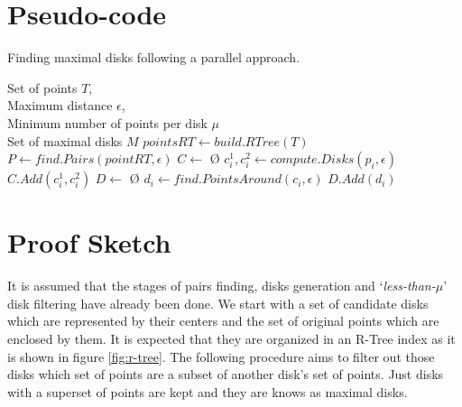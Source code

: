 \documentclass[12pt]{scrartcl}
\begin{document}
\renewcommand{\algorithmicrequire}{\textbf{Input:}}
\renewcommand{\algorithmicensure}{\textbf{Output:}}
\renewcommand{\algorithmicforall}{\textbf{for each}}

\section*{Pseudo-code}

\begin{algorithm}
  \caption{Finding maximal disks following a parallel approach.}
  \label{alg:maximals}
  \begin{algorithmic}
    \REQUIRE 
    Set of points $T$, \\
    Maximum distance $\epsilon$, \\ 
    Minimum number of points per disk $\mu$ \\

    \ENSURE 
    Set of maximal disks $M$ 
    \vspace{5mm}
    \STATE $pointsRT \leftarrow build.RTree(T)$ 
    \STATE $P \leftarrow find.Pairs(pointRT, \epsilon)$ 
    \STATE $C \leftarrow$ \O{}
      \STATE $c_i^1, c_i^2 \leftarrow compute.Disks(p_i,\epsilon)$ 
      \STATE $C.Add(c_i^1, c_i^2)$
    \ENDFOR
    \STATE $D \leftarrow$ \O{}
      \STATE $d_i \leftarrow find.PointsAround(c_i, \epsilon)$ 
	\STATE $D.Add(d_i)$
      \ENDIF
    \ENDFOR
  \end{algorithmic}
\end{algorithm}

\section*{Proof Sketch}
It is assumed that the stages of pairs finding, disks generation and `\textit{less-than-$\mu$}' disk filtering have already been done. We start with a set of candidate disks which are represented by their centers and the set of original points which are enclosed by them.  It is expected that they are organized in an R-Tree index as it is shown in figure \ref{fig:r-tree}.  The following procedure aims to filter out those disks which set of points are a subset of another disk's set of points.  Just disks with a superset of points are kept and they are knows as maximal disks. 
\end{document}
